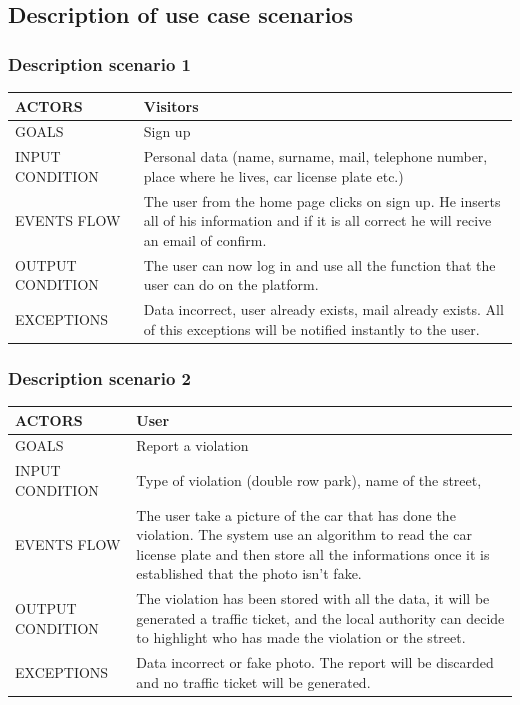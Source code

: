 \subsection{Description of use case scenarios}
\subsubsection{Description scenario 1}


\begin{center}
	\begin{tabular}{ | l | p{6cm} | } 
		\hline
		ACTORS & Visitors  \\ 
		\hline
		GOALS & Sign up  \\ 
		\hline
		INPUT CONDITION & Personal data (name, surname, mail, telephone number, place where he lives, car license plate etc.)  \\ 
		\hline
		EVENTS FLOW & The user from the home page clicks on sign up. He inserts all of his information and if it is all correct he will recive an email of confirm.  \\ 
		\hline
		OUTPUT CONDITION & The user can now log in and use all the function that the user can do on the platform.  \\ 
		\hline
		EXCEPTIONS & Data incorrect, user already exists, mail already exists. All of this exceptions will be notified instantly to the user. \\ 
		\hline
	\end{tabular}
\end{center}

\subsubsection{Description scenario 2}

\begin{center}
	\begin{tabular}{ | l | p{6cm} | } 
		\hline
		ACTORS & User  \\ 
		\hline
		GOALS & Report a violation  \\ 
		\hline
		INPUT CONDITION & Type of violation (double row park), name of the street,  \\ 
		\hline
		EVENTS FLOW & The user take a picture of the car that has done the violation. The system use an algorithm to read the car license plate and then store all the informations once it is established that the photo isn't fake.  \\ 
		\hline
		OUTPUT CONDITION & The violation has been stored with all the data, it will be generated a traffic ticket, and the local authority can decide to highlight who has made the violation or the street. \\ 
		\hline
		EXCEPTIONS & Data incorrect or fake photo. The report will be discarded and no traffic ticket will be generated.  \\ 
		\hline
	\end{tabular}
\end{center}

